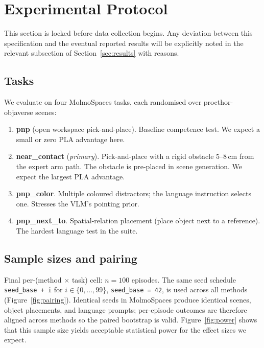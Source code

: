 \documentclass[11pt]{article}
\begin{document}
\section{Experimental Protocol}
\label{sec:protocol}

This section is locked before data collection begins. Any deviation
between this specification and the eventual reported results will be
explicitly noted in the relevant subsection of
Section~\ref{sec:results} with reasons.

\subsection{Tasks}
\label{sec:protocol-tasks}

We evaluate on four MolmoSpaces tasks, each randomised over
procthor-objaverse scenes:

\begin{enumerate}[leftmargin=1.5em,topsep=0.2em,itemsep=0.2em]
\item \textbf{pnp} (open workspace pick-and-place). Baseline competence
  test. We expect a small or zero PLA advantage here.
\item \textbf{near\_contact} (\emph{primary}). Pick-and-place with a
  rigid obstacle 5--8\,cm from the expert arm path. The obstacle is
  pre-placed in scene generation. We expect the largest PLA advantage.
\item \textbf{pnp\_color}. Multiple coloured distractors; the language
  instruction selects one. Stresses the VLM's pointing prior.
\item \textbf{pnp\_next\_to}. Spatial-relation placement (place object
  next to a reference). The hardest language test in the suite.
\end{enumerate}

\subsection{Sample sizes and pairing}
\label{sec:protocol-N}

Final per-(method $\times$ task) cell: $n = 100$ episodes. The same
seed schedule \verb|seed_base + i| for $i \in \{0, \dots, 99\}$,
\verb|seed_base = 42|, is used across all methods
(Figure~\ref{fig:pairing}). Identical seeds in MolmoSpaces produce
identical scenes, object placements, and language prompts; per-episode
outcomes are therefore aligned across methods so the paired bootstrap is
valid. Figure~\ref{fig:power} shows that this sample size yields
acceptable statistical power for the effect sizes we expect.
\end{document}
